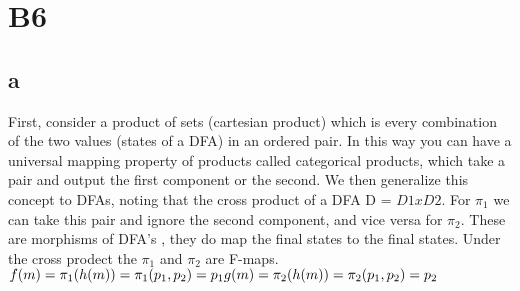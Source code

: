 \documentclass[12pt]{article}
\begin{document}
\begin{comment}
Case: U is finite. , pick m greater than every element in U. \\ 
Case: U is infinite. We have that m and p exist, such that if $n' \ge m$ then $n' \epsilon U$ iff $n' +p \epsilon U$. Since U is infinite, there is a smallest $m_1 \ge m$ such that $m_1 \epsilon U$. Pick any $n \epsilon U$ with $n > m_1 \ge m$. $n-p \ge m$ or $n-p < m$, $n-p \epsilon U$. Again either $n-2p \ge  m$ and if $n \epsilon U$ and $n \ge m$, $ \exists k \epsilon$ natural numbers such that $n-kp \epsilon U$ and $n-kp$ is the smallest such number $\ge m_1$. \\
$n-kp = m_1 + k$ where $m_1 \le n-kp < m_1 + p \rightarrow 0 \le k < p$ \\
The above reasoning implies that there exist $m_1, m_2, ..., m+k \epsilon U$ such that $m_1 < m_2 < ... < m_k < m_1 + p$ and $n-kp = m_i$. \\
The above is correct but more correct would be proof by decending induction from q to 0: $n \epsilon {m_i +jp | j \ge 0}$ and $n \epsilon U, n\ge m_1$ and $n - m_1 = pq +k$ with $0 \le k \le p-1$. Then $n=m_1 + k + pq$ with $m_1 + k = m_i$. Need to show if $m \epsilon U$ then ${m+jp | i \ge 0} \subseteq U$. Induction on j with a panhandle DFA. 
Special case of the 3rd part (from part 2 also)
homomorphism
\end{comment}




\section*{B6}
\subsection*{a}
First, consider a product of sets (cartesian product) which is every combination of the two values (states of a DFA) in an ordered pair. In this way you can have a 
universal mapping property of products called categorical products, which take a pair and output the first component or the second. We then generalize this concept to DFAs,
noting that the cross product of a DFA D = $D1 x D2$. For $\pi_1$ we can take this pair and ignore the second component, and vice versa for $\pi_2$. These are morphisms of DFA's
, they do map the final states to the final states. Under the cross prodect the $\pi_1$ and $\pi_2$ are F-maps.
$f(m) = \pi_1 (h(m))= \pi_1 (p_1 , p_2 ) = p_1 \\
g(m) = \pi_2 (h(m))= \pi_2 (p_1 , p_2 ) = p_2$
\end{document}
